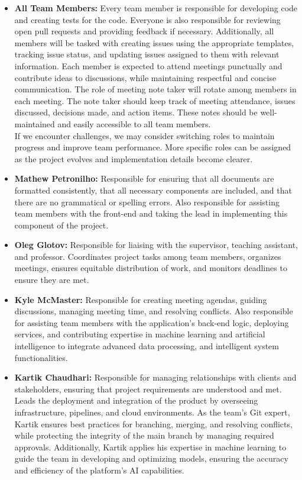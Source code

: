 \documentclass{article}
\begin{document}
\begin{itemize}
	\item \textbf{All Team Members:} Every team member is responsible for developing code and creating tests for the code. Everyone is also responsible for reviewing open 
  pull requests and providing feedback if necessary. Additionally, all members will be tasked with creating issues using the appropriate templates, tracking issue status, 
  and updating issues assigned to them with relevant information. Each member is expected to attend meetings punctually and contribute ideas to discussions, while 
  maintaining respectful and concise communication. The role of meeting note taker will rotate among members in each meeting. The note taker should keep track of meeting attendance,
   issues discussed, decisions made, and action items. These notes should be well-maintained and easily accessible to all team members.
    \\ If we encounter challenges, we may consider switching roles to maintain progress and improve team performance. More specific roles can be assigned as the project evolves 
    and implementation details become clearer.
    \item \textbf{Mathew Petronilho:}
    Responsible for ensuring that all documents are formatted consistently, that all necessary components are included, and that there are no grammatical or spelling errors. 
    Also responsible for assisting team members with the front-end and taking the lead in implementing this component of the project.

    \item \textbf{Oleg Glotov:} Responsible for liaising with the supervisor, teaching assistant, and professor. 
    Coordinates project tasks among team members, organizes meetings, ensures equitable distribution of work, and monitors deadlines to ensure they are met.
    
    \item \textbf{Kyle McMaster:} Responsible for creating meeting agendas, guiding discussions, managing meeting time, and resolving conflicts. 
    Also responsible for assisting team members with the application's back-end logic, deploying services, and contributing expertise in machine learning and artificial intelligence 
    to integrate advanced data processing, and intelligent system functionalities.
    
    \item \textbf{Kartik Chaudhari:} Responsible for managing relationships with clients and stakeholders, ensuring that project requirements are understood and met. Leads the deployment and integration of the product by overseeing infrastructure, pipelines, and cloud environments. As the team's Git expert, Kartik ensures best practices for branching, merging, and resolving conflicts, while protecting the integrity of the main branch by managing required approvals. Additionally, Kartik applies his expertise in machine learning to guide the team in developing and optimizing models, ensuring the accuracy and efficiency of the platform's AI capabilities.

    
\end{itemize}
\end{document}
